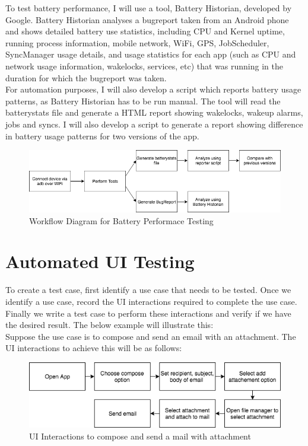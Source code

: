 To test battery performance, I will use a tool, Battery Historian, developed by Google. Battery Historian analyses a bugreport taken from an Android phone and shows detailed battery use statistics, including CPU and Kernel uptime, running process information, mobile network, WiFi, GPS, JobScheduler, SyncManager usage details, and usage statistics for each app (such as CPU and network usage information, wakelocks, services, etc) that was running in the duration for which the bugreport was taken.\cite{batteryhistorian} \\

For automation purposes, I will also develop a script which reports battery usage patterns, as Battery Historian has to be run manual. The tool will read the batterystats file and generate a HTML report showing wakelocks, wakeup alarms, jobs and syncs. I will also develop a script to generate a report showing difference in battery usage patterns for two versions of the app.

\begin{figure}[!h]
 	\begin{center}
		\includegraphics[scale=0.6]{Workflow}
		\caption{Workflow Diagram for Battery Performace Testing}
	\end{center}
\end{figure}

\section{Automated UI Testing}

To create a test case, first identify a use case that needs to be tested. Once we identify a use case, record the UI interactions required to complete the use case. Finally we write a test case to perform these interactions and verify if we have the desired result. The below example will illustrate this:\\

Suppose the use case is to compose and send an email with an attachment. The UI interactions to achieve this will be as follows:
\vspace{0.5cm}
\begin{figure}[!h]
 	\begin{center}
		\includegraphics[scale=0.7]{uiflow}
		\caption{UI Interactions to compose and send a mail with attachment}
	\end{center}
\end{figure}

